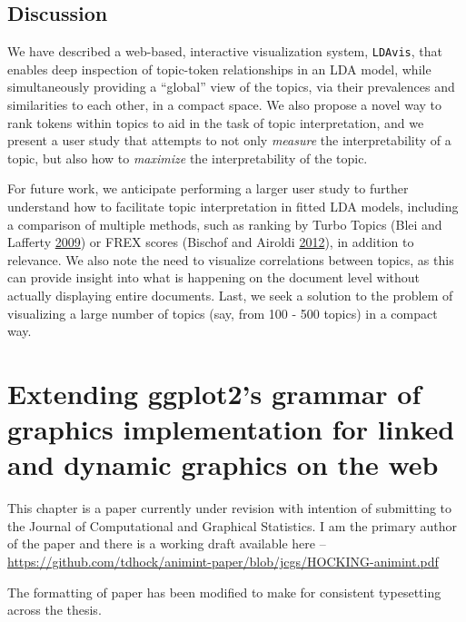 \documentclass[12pt,]{isuthesis}
\begin{document}
\section{Discussion}\label{section:futurework}

We have described a web-based, interactive visualization system,
\texttt{LDAvis}, that enables deep inspection of topic-token
relationships in an LDA model, while simultaneously providing a
``global'' view of the topics, via their prevalences and similarities to
each other, in a compact space. We also propose a novel way to rank
tokens within topics to aid in the task of topic interpretation, and we
present a user study that attempts to not only \emph{measure} the
interpretability of a topic, but also how to \emph{maximize} the
interpretability of the topic.

For future work, we anticipate performing a larger user study to further
understand how to facilitate topic interpretation in fitted LDA models,
including a comparison of multiple methods, such as ranking by Turbo
Topics (Blei and Lafferty \protect\hyperlink{ref-Blei-2009}{2009}) or
FREX scores (Bischof and Airoldi \protect\hyperlink{ref-Bischof}{2012}),
in addition to relevance. We also note the need to visualize
correlations between topics, as this can provide insight into what is
happening on the document level without actually displaying entire
documents. Last, we seek a solution to the problem of visualizing a
large number of topics (say, from 100 - 500 topics) in a compact way.

\chapter{Extending ggplot2's grammar of graphics implementation for linked and dynamic graphics on the web}

This chapter is a paper currently under revision with intention of
submitting to the Journal of Computational and Graphical Statistics. I
am the primary author of the paper and there is a working draft
available here --
\url{https://github.com/tdhock/animint-paper/blob/jcgs/HOCKING-animint.pdf}

The formatting of paper has been modified to make for consistent
typesetting across the thesis.

\end{document}
